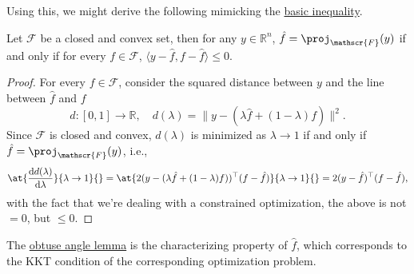 Using this, we might derive the following mimicking the \hyperref[eq:basic-inequality]{basic inequality}.

\begin{lemma}\label{lma:obtuse-angle}
	Let \(\mathscr{F} \) be a closed and convex set, then for any \(y\in \mathbb{R} ^n\), \(\hat{f} = \proj_{\mathscr{F} }(y) \) if and only if for every \(f\in \mathscr{F} \), \(\langle y - \hat{f} , f - \hat{f} \rangle \leq 0\).
	\begin{center}
	\end{center}
\end{lemma}
\begin{proof}
	For every \(f\in \mathscr{F} \), consider the squared distance between \(y\) and the line between \(\hat{f} \) and \(f\)
	\[
		d\colon [0, 1] \to \mathbb{R} ,\quad d(\lambda ) = \lVert y - (\lambda \hat{f} + (1 - \lambda )f ) \rVert ^2.
	\]
	Since \(\mathscr{F} \) is closed and convex, \(d(\lambda )\) is minimized as \(\lambda \to 1\) if and only if \(\hat{f} = \proj_{\mathscr{F} } (y)\), i.e.,
	\[
		\at{\frac{\mathrm{d}d(\lambda )}{\mathrm{d}\lambda }}{\lambda \to 1}{}
		= \at{2 (y - ( \lambda \hat{f} + (1-\lambda ) f ) ) ^{\top} (f - \hat{f})}{\lambda \to 1}{}
		= 2 (y - \hat{f} ) ^{\top} (f - \hat{f}),
	\]
	with the fact that we're dealing with a constrained optimization, the above is not \(= 0\), but \(\leq 0\).
\end{proof}

\begin{remark}
	The \hyperref[lma:obtuse-angle]{obtuse angle lemma} is the characterizing property of \(\hat{f} \), which corresponds to the KKT condition of the corresponding optimization problem.
\end{remark}

